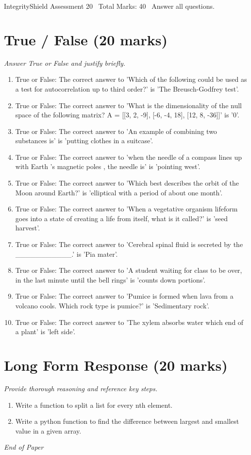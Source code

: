 \documentclass[12pt]{article}
\begin{document}
\begin{center}
IntegrityShield Assessment 20 \
Total Marks: 40 \
Answer all questions.
\end{center}

\section*{True / False (20 marks)}
\textit{Answer True or False and justify briefly.}
\begin{enumerate}[label=\arabic*.]
\item True or False: The correct answer to 'Which of the following could be used as a test for autocorrelation up to third order?' is 'The Breusch-Godfrey test'.
\item True or False: The correct answer to 'What is the dimensionality of the null space of the following matrix? A = [[3, 2, -9], [-6, -4, 18], [12, 8, -36]]' is '0'.
\item True or False: The correct answer to 'An example of combining two substances is' is 'putting clothes in a suitcase'.
\item True or False: The correct answer to 'when the needle of a compass lines up with Earth 's magnetic poles , the needle is' is 'pointing west'.
\item True or False: The correct answer to 'Which best describes the orbit of the Moon around Earth?' is 'elliptical with a period of about one month'.
\item True or False: The correct answer to 'When a vegetative organism lifeform goes into a state of creating a life from itself, what is it called?' is 'seed harvest'.
\item True or False: The correct answer to 'Cerebral spinal fluid is secreted by the \_\_\_\_\_\_\_\_\_\_\_.' is 'Pia mater'.
\item True or False: The correct answer to 'A student waiting for class to be over, in the last minute until the bell rings' is 'counts down portions'.
\item True or False: The correct answer to 'Pumice is formed when lava from a volcano cools. Which rock type is pumice?' is 'Sedimentary rock'.
\item True or False: The correct answer to 'The xylem absorbs water which end of a plant' is 'left side'.
\end{enumerate}

\section*{Long Form Response (20 marks)}
\textit{Provide thorough reasoning and reference key steps.}
\begin{enumerate}[label=\arabic*.]
\item Write a function to split a list for every nth element.
\item Write a python function to find the difference between largest and smallest value in a
given array.
\end{enumerate}

\vfill
\noindent\textit{End of Paper}
\end{document}
